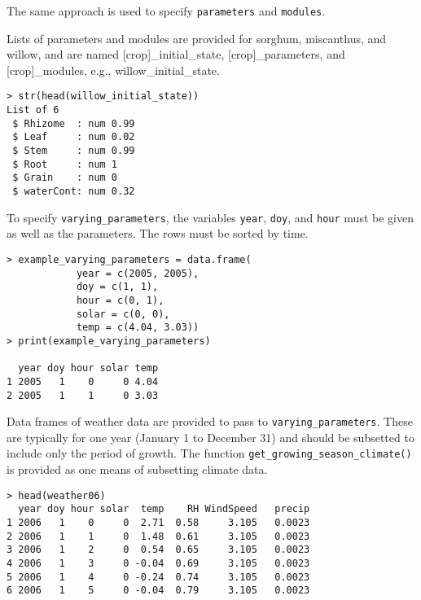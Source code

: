 \documentclass{article}
\newcommand{\code}[1]{\texttt{#1}}
\begin{document}
The same approach is used to specify \code{parameters} and \code{modules}.

Lists of parameters and modules are provided for sorghum, miscanthus, and willow, and are named [crop]\_initial\_state, [crop]\_parameters, and [crop]\_modules, e.g., willow\_initial\_state.

\begin{center}
\begin{lstlisting}
> str(head(willow_initial_state))
List of 6
 $ Rhizome  : num 0.99
 $ Leaf     : num 0.02
 $ Stem     : num 0.99
 $ Root     : num 1
 $ Grain    : num 0
 $ waterCont: num 0.32
\end{lstlisting}
\end{center}

To specify \code{varying\_parameters}, the variables \code{year}, \code{doy}, and \code{hour} must be given as well as the parameters. The rows must be sorted by time.

\begin{center}
\begin{lstlisting}
> example_varying_parameters = data.frame(
            year = c(2005, 2005),
            doy = c(1, 1),
            hour = c(0, 1), 
            solar = c(0, 0),
            temp = c(4.04, 3.03))
> print(example_varying_parameters)

  year doy hour solar temp
1 2005   1    0     0 4.04
2 2005   1    1     0 3.03
\end{lstlisting}
\end{center}

Data frames of weather data are provided to pass to \code{varying\_parameters}. These are typically for one year (January 1 to December 31) and should be subsetted to include only the period of growth. The function \code{get\_growing\_season\_climate()} is provided as one means of subsetting climate data.  

\begin{center}
\begin{lstlisting}
> head(weather06)
  year doy hour solar  temp    RH WindSpeed   precip
1 2006   1    0     0  2.71  0.58     3.105   0.0023
2 2006   1    1     0  1.48  0.61     3.105   0.0023
3 2006   1    2     0  0.54  0.65     3.105   0.0023
4 2006   1    3     0 -0.04  0.69     3.105   0.0023
5 2006   1    4     0 -0.24  0.74     3.105   0.0023
6 2006   1    5     0 -0.04  0.79     3.105   0.0023
\end{lstlisting}
\end{center}
\end{document}

